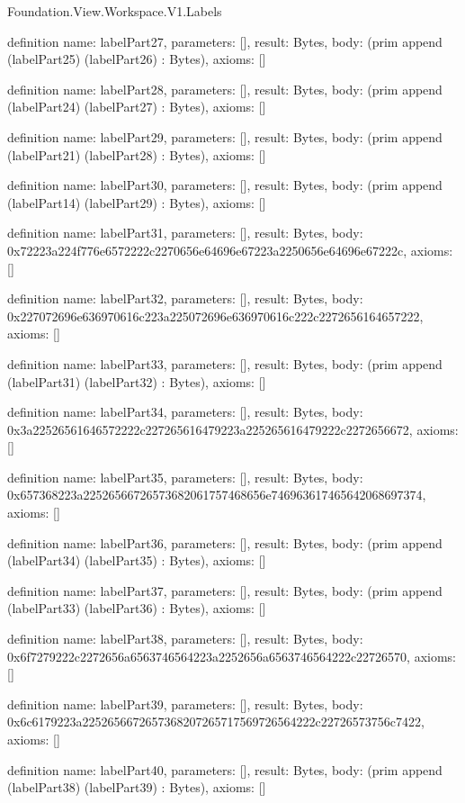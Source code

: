 \begin{lexlean}{Foundation.View.Workspace.V1.Labels}
\begin{semanticmodule}
definition{
  name: labelPart27,
  parameters: [],
  result: Bytes,
  body: (prim append (labelPart25) (labelPart26) : Bytes),
  axioms: []
}

definition{
  name: labelPart28,
  parameters: [],
  result: Bytes,
  body: (prim append (labelPart24) (labelPart27) : Bytes),
  axioms: []
}

definition{
  name: labelPart29,
  parameters: [],
  result: Bytes,
  body: (prim append (labelPart21) (labelPart28) : Bytes),
  axioms: []
}

definition{
  name: labelPart30,
  parameters: [],
  result: Bytes,
  body: (prim append (labelPart14) (labelPart29) : Bytes),
  axioms: []
}

definition{
  name: labelPart31,
  parameters: [],
  result: Bytes,
  body: 0x72223a224f776e6572222c2270656e64696e67223a2250656e64696e67222c,
  axioms: []
}

definition{
  name: labelPart32,
  parameters: [],
  result: Bytes,
  body: 0x227072696e636970616c223a225072696e636970616c222c2272656164657222,
  axioms: []
}

definition{
  name: labelPart33,
  parameters: [],
  result: Bytes,
  body: (prim append (labelPart31) (labelPart32) : Bytes),
  axioms: []
}

definition{
  name: labelPart34,
  parameters: [],
  result: Bytes,
  body: 0x3a22526561646572222c227265616479223a225265616479222c2272656672,
  axioms: []
}

definition{
  name: labelPart35,
  parameters: [],
  result: Bytes,
  body: 0x657368223a22526566726573682061757468656e746963617465642068697374,
  axioms: []
}

definition{
  name: labelPart36,
  parameters: [],
  result: Bytes,
  body: (prim append (labelPart34) (labelPart35) : Bytes),
  axioms: []
}

definition{
  name: labelPart37,
  parameters: [],
  result: Bytes,
  body: (prim append (labelPart33) (labelPart36) : Bytes),
  axioms: []
}

definition{
  name: labelPart38,
  parameters: [],
  result: Bytes,
  body: 0x6f7279222c2272656a6563746564223a2252656a6563746564222c22726570,
  axioms: []
}

definition{
  name: labelPart39,
  parameters: [],
  result: Bytes,
  body: 0x6c6179223a2252656672657368207265717569726564222c22726573756c7422,
  axioms: []
}

definition{
  name: labelPart40,
  parameters: [],
  result: Bytes,
  body: (prim append (labelPart38) (labelPart39) : Bytes),
  axioms: []
}


\end{semanticmodule}
\end{lexlean}
